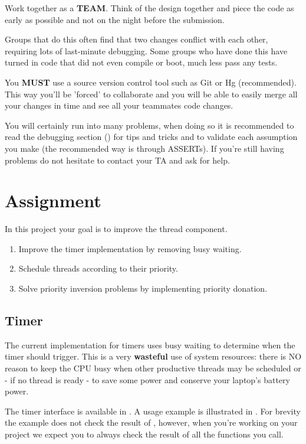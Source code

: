 Work together as a \textbf{TEAM}. Think of the design together and piece the code as early as
possible and not on the night before the submission.

Groups that do this often find that two changes conflict with each other, requiring lots of
last-minute debugging. Some groups who have done this have turned in code that did not
even compile or boot, much less pass any tests.

You \textbf{MUST} use a source version control tool such as Git \cite{git} or Hg \cite{tortoiseHg}
(recommended). This way you'll be 'forced' to collaborate and you will be able to easily merge all
your changes in time and see all your teammates code changes.

You will certainly run into many problems, when doing so it is recommended to read the debugging
section () for tips and tricks and to validate
each assumption you make (the recommended way is through ASSERTs).
If you're still having problems do not hesitate to contact your TA and ask for help.

\section{Assignment}

In this project your goal is to improve the thread component.
\begin{enumerate}
	\item Improve the timer implementation by removing busy waiting.
	\item Schedule threads according to their priority.
	\item Solve priority inversion problems by implementing priority donation.
\end{enumerate}

\subsection{Timer}

The current implementation for timers uses busy waiting to determine when the timer should trigger.
This is a very \textbf{wasteful} use of system resources: there is NO reason to keep the
CPU busy when other productive threads may be scheduled or - if no thread is ready - to save some
power and conserve your laptop's battery power.

The timer interface is available in . A usage example is illustrated in
. For brevity the example does not check the result of ,
however, when you're working on your project we expect you to always check the result of all the
functions you call.

